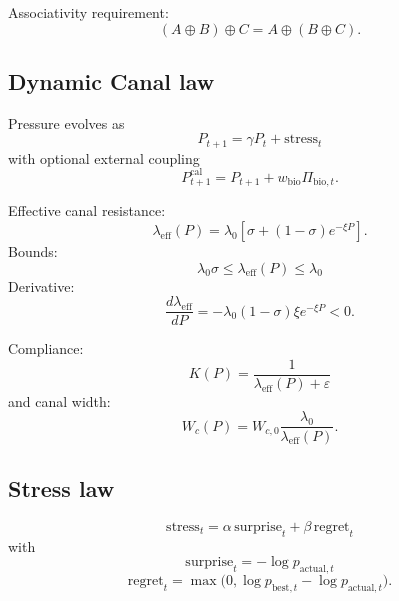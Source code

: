 \documentclass[11pt,a4paper]{article}
\begin{document}
Associativity requirement:
\begin{equation}
(A\oplus B)\oplus C=A\oplus(B\oplus C).
\label{eq:avmr_assoc}
\end{equation}

\subsection{Dynamic Canal law}

Pressure evolves as
\begin{equation}
P_{t+1}=\gamma P_t+\mathrm{stress}_t
\label{eq:pressure_update}
\end{equation}
with optional external coupling
\begin{equation}
P_{t+1}^{\mathrm{cal}}=P_{t+1}+w_{\mathrm{bio}}\Pi_{\mathrm{bio},t}.
\label{eq:pressure_cal}
\end{equation}

Effective canal resistance:
\begin{equation}
\lambda_{\mathrm{eff}}(P)=
\lambda_0\left[\sigma+(1-\sigma)e^{-\xi P}\right].
\label{eq:lambda_eff}
\end{equation}
Bounds:
\begin{equation}
\lambda_0\sigma\le\lambda_{\mathrm{eff}}(P)\le\lambda_0
\label{eq:lambda_bounds}
\end{equation}
Derivative:
\begin{equation}
\frac{d\lambda_{\mathrm{eff}}}{dP}
=
-\lambda_0(1-\sigma)\xi e^{-\xi P}<0.
\label{eq:lambda_derivative}
\end{equation}

Compliance:
\begin{equation}
K(P)=\frac{1}{\lambda_{\mathrm{eff}}(P)+\varepsilon}
\label{eq:compliance}
\end{equation}
and canal width:
\begin{equation}
W_c(P)=W_{c,0}\frac{\lambda_0}{\lambda_{\mathrm{eff}}(P)}.
\label{eq:canal_width}
\end{equation}

\subsection{Stress law}

\begin{equation}
\mathrm{stress}_t=
\alpha\,\mathrm{surprise}_t+\beta\,\mathrm{regret}_t
\label{eq:stress}
\end{equation}
with
\begin{equation}
\mathrm{surprise}_t=-\log p_{\mathrm{actual},t}
\label{eq:surprise}
\end{equation}
\begin{equation}
\mathrm{regret}_t=
\max\bigl(0,\log p_{\mathrm{best},t}-\log p_{\mathrm{actual},t}\bigr).
\label{eq:regret}
\end{equation}
\end{document}
